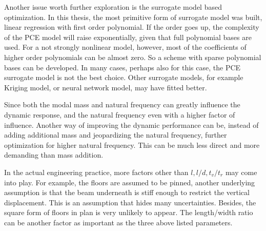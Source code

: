 Another issue worth further exploration is the surrogate model based optimization. In this thesis, the most primitive form of surrogate model was built, linear regression with first order polynomial. If the order goes up, the complexity of the PCE model will raise exponentially, given that full polynomial bases are used. For a not strongly nonlinear model, however, most of the coefficients of higher order polynomials can be almost zero. So a scheme with sparse polynomial bases can be developed. In many cases, perhaps also for this case, the PCE surrogate model is not the best choice. Other surrogate models, for example Kriging model, or neural network model, may have fitted better. 

Since both the modal mass and natural frequency can greatly influence the dynamic response, and the natural frequency even with a higher factor of influence. Another way of improving the dynamic performance can be, instead of adding additional mass and jeopardizing the natural frequency, further optimization for higher natural frequency. This can be much less direct and more demanding than mass addition. 

In the actual engineering practice, more factors other than $l,l/d,t_v/t_r$ may come into play. For example, the floors are assumed to be pinned, another underlying assumption is that the beam underneath is stiff enough to restrict the vertical displacement. This is an assumption that hides many uncertainties. Besides, the square form of floors in plan is very unlikely to appear. The length/width ratio can be another factor as important as the three above listed parameters.